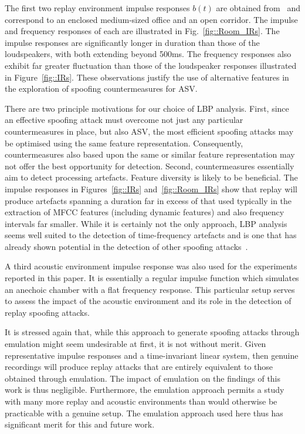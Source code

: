 The first two replay environment impulse responses $b(t)$ are obtained from~\cite{Jeub2009} and correspond to an enclosed medium-sized office and an open corridor.  The impulse and frequency responses of each are illustrated in Fig.~\ref{fig::Room_IRs}.  The impulse responses are significantly longer in duration than those of the loudspeakers, with both extending beyond 500ms.  The frequency responses also exhibit far greater fluctuation than those of the loudspeaker responses illustrated in Figure~\ref{fig::IRs}.  These observations justify the use of alternative features in the exploration of spoofing countermeasures for ASV.  

There are two principle motivations for our choice of LBP analysis.  First, since an effective spoofing attack must overcome not just any particular countermeasures in place, but also ASV, the most efficient spoofing attacks may be optimised using the same feature representation.  Consequently, countermeasures also based upon the same or similar feature representation may not offer the best opportunity for detection.  Second, countermeasures essentially aim to detect processing artefacts.  Feature diversity is likely to be beneficial.  The impulse responses in Figures~\ref{fig::IRs} and~\ref{fig::Room_IRs} show that replay will produce artefacts spanning a duration far in excess of that used typically in the extraction of MFCC features (including dynamic features) and also frequency intervals far smaller.  While it is certainly not the only approach, LBP analysis seems well suited to the detection of time-frequency artefacts and is one that has already shown potential in the detection of other spoofing attacks~\cite{Alegre2013a,AlegreBTAS2013}.  

A third acoustic environment impulse response was also used for the experiments reported in this paper.  It is essentially a regular impulse function which simulates an anechoic chamber with a flat frequency response.  This particular setup serves to assess the impact of the acoustic environment and its role in the detection of replay spoofing attacks.

It is stressed again that, while this approach to generate spoofing attacks through emulation might seem undesirable at first, it is not without merit.  Given representative impulse responses and a time-invariant linear system, then genuine recordings will produce replay attacks that are entirely equivalent to those obtained through emulation.  The impact of emulation on the findings of this work is thus negligible.  Furthermore, the emulation approach permits a study with many more replay and acoustic environments than would otherwise be practicable with a genuine setup.  The emulation approach used here thus has significant merit for this and future work.


